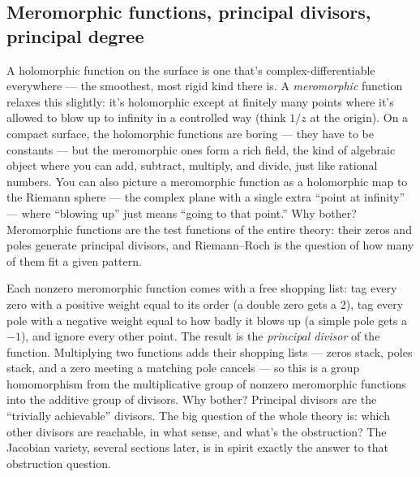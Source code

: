 \subsection{Meromorphic functions, principal divisors, principal degree}



\begin{layman}
A holomorphic function on the surface is one that's complex-differentiable
everywhere --- the smoothest, most rigid kind there is. A \emph{meromorphic}
function relaxes this slightly: it's holomorphic except at finitely many
points where it's allowed to blow up to infinity in a controlled way (think
\(1/z\) at the origin). On a compact surface, the holomorphic functions are
boring --- they have to be constants --- but the meromorphic ones form a rich
field, the kind of algebraic object where you can add, subtract, multiply,
and divide, just like rational numbers. You can also picture a meromorphic
function as a holomorphic map to the Riemann sphere --- the complex plane with
a single extra ``point at infinity'' --- where ``blowing up'' just means
``going to that point.'' Why bother? Meromorphic functions are the test
functions of the entire theory: their zeros and poles generate principal
divisors, and Riemann--Roch is the question of how many of them fit a given
pattern.
\end{layman}



\begin{layman}
Each nonzero meromorphic function comes with a free shopping list: tag every
zero with a positive weight equal to its order (a double zero gets a 2), tag
every pole with a negative weight equal to how badly it blows up (a simple
pole gets a \(-1\)), and ignore every other point. The result is the
\emph{principal divisor} of the function. Multiplying two functions adds
their shopping lists --- zeros stack, poles stack, and a zero meeting a
matching pole cancels --- so this is a group homomorphism from the
multiplicative group of nonzero meromorphic functions into the additive
group of divisors. Why bother? Principal divisors are the
``trivially achievable'' divisors. The big question of the whole theory is:
which other divisors are reachable, in what sense, and what's the
obstruction? The Jacobian variety, several sections later, is in spirit
exactly the answer to that obstruction question.
\end{layman}



